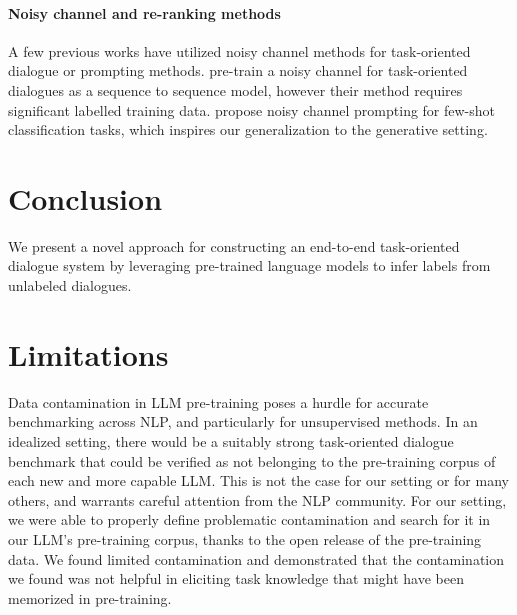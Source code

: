 \documentclass[11pt]{article}
\begin{document}
\paragraph{Noisy channel and re-ranking methods} 
A few previous works have utilized noisy channel methods for task-oriented dialogue or prompting methods. \citet{liu_pretraining_2021} pre-train a noisy channel for task-oriented dialogues as a sequence to sequence model, however their method requires significant labelled training data. \citet{min-etal-2022-noisy} propose noisy channel prompting for few-shot classification tasks, which inspires our generalization to the generative setting.

\section{Conclusion}

We present a novel approach for constructing an end-to-end task-oriented dialogue system by leveraging pre-trained language models to infer labels from unlabeled dialogues.

\section{Limitations}

Data contamination in LLM pre-training poses a hurdle for accurate benchmarking across NLP, and particularly for unsupervised methods.
In an idealized setting, there would be a suitably strong task-oriented dialogue benchmark that could be verified as not belonging to the pre-training corpus of each new and more capable LLM.
This is not the case for our setting or for many others, and warrants careful attention from the NLP community.
For our setting, we were able to properly define problematic contamination and search for it in our LLM's pre-training corpus, thanks to the open release of the pre-training data.
We found limited contamination and demonstrated that the contamination we found was not helpful in eliciting task knowledge that might have been memorized in pre-training. 
\end{document}
